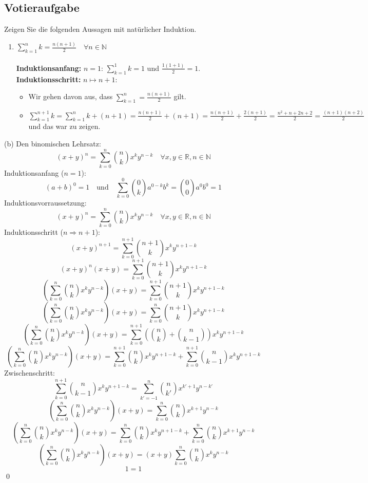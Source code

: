 \documentclass[a4paper]{article}
\begin{document}
\subsection{Votieraufgabe}
Zeigen Sie die folgenden Aussagen mit natürlicher Induktion.\\
\begin{enumerate}[label=(\alph*)]
    \item $\sum\limits_{k=1}^n k = \frac{n(n + 1)}{2} \quad \forall n \in \mathbb{N}$\\\\
        \textbf{Induktionsanfang:} $n=1$: $\sum\limits^1_{k=1}k=1$ und $\frac{1(1+1)}{2}=1$. \checkmark\\
    \textbf{Induktionsschritt:} $n \mapsto n+1$:
    \begin{itemize}
        \item Wir gehen davon aus, dass $\sum\limits^n_{k=1}=\frac{n(n+1)}{2}$ gilt.
        \item \(\sum\limits^{n+1}_{k=1}k=\sum\limits^n_{k=1}k+(n+1)=\frac{n(n+1)}{2}+(n+1)=\frac{n(n+1)}{2}+\frac{2(n+1)}{2}=\frac{n^2+n+2n+2}{2}=\frac{(n+1)(n+2)}{2}\) und das war zu zeigen. \checkmark
    \end{itemize}
\end{enumerate}
(b) Den binomischen Lehrsatz:
\[
(x + y)^n = \sum\limits_{k=0}^n \binom{n}{k} x^ky^{n-k} \quad \forall x,y \in \mathbb{R}, n \in \mathbb{N}
\]
Induktionsanfang ($n = 1$):\\
\[
(a + b)^0 = 1 \quad\text{und}\quad \sum_{k=0}^{0} \binom{0}{k} a^{0-k} b^k = \binom{0}{0} a^0 b^0 = 1
\]
Induktionsvorraussetzung:\\
\[
(x + y)^n = \sum\limits_{k=0}^n \binom{n}{k} x^ky^{n-k} \quad \forall x,y \in \mathbb{R}, n \in \mathbb{N}
\]
Induktionsschritt ($n \Rightarrow n + 1$):\\
\[
(x + y)^{n + 1} = \sum\limits_{k=0}^{n + 1} \binom{n + 1}{k} x^ky^{n + 1 -k}
\]
\[
(x+y)^n (x+y) = \sum\limits_{k=0}^{n + 1} \binom{n + 1}{k} x^ky^{n + 1 -k}
\]
\[
\left( \sum\limits_{k=0}^{n} \binom{n}{k} x^k y^{n-k} \right) (x+y) = \sum\limits_{k=0}^{n + 1} \binom{n + 1}{k} x^ky^{n + 1 -k}
\]
\[
\left( \sum\limits_{k=0}^{n} \binom{n}{k} x^k y^{n-k} \right) (x+y) = \sum\limits_{k=0}^{n} \binom{n + 1}{k} x^ky^{n + 1 -k}
\]
\[
\left( \sum\limits_{k=0}^{n} \binom{n}{k} x^k y^{n-k} \right) (x+y) = \sum\limits_{k=0}^{n+1} \left( \binom{n}{k} + \binom{n}{k-1} \right) x^k y^{n+1-k}
\]
\[
\left( \sum\limits_{k=0}^{n} \binom{n}{k} x^k y^{n-k} \right) (x+y) = \sum\limits_{k=0}^{n+1} \binom{n}{k} x^k y^{n+1-k} + \sum\limits_{k=0}^{n+1} \binom{n}{k-1} x^k y^{n+1-k}
\]
Zwischenschritt:
\[
\sum\limits_{k=0}^{n+1} \binom{n}{k-1} x^k y^{n+1-k} = \sum\limits_{k'=-1}^{n} \binom{n}{k'} x^{k'+1} y^{n-k'}
\]
\[
\left( \sum\limits_{k=0}^{n} \binom{n}{k} x^k y^{n-k} \right) (x+y) = \sum\limits_{k=0}^{n} \binom{n}{k} x^{k+1} y^{n-k}
\]
\[
\left( \sum\limits_{k=0}^{n} \binom{n}{k} x^k y^{n-k} \right) (x+y) = \sum\limits_{k=0}^{n} \binom{n}{k} x^k y^{n+1-k} + \sum\limits_{k=0}^{n} \binom{n}{k} x^{k+1} y^{n-k}
\]
\[
\left( \sum\limits_{k=0}^{n} \binom{n}{k} x^k y^{n-k} \right) (x+y) = (x+y) \sum\limits_{k=0}^{n} \binom{n}{k} x^k y^{n-k}
\]
\[
1 = 1
\] \qed
\bigskip
\end{document}
